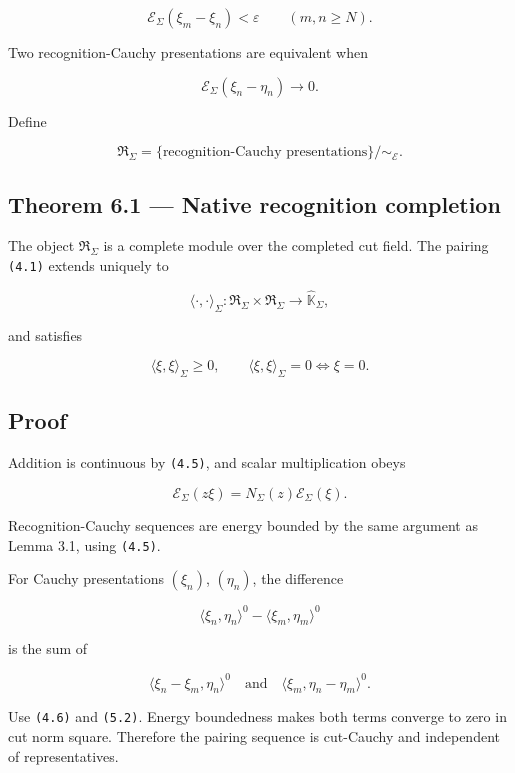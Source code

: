 \[
\mathcal E_\Sigma(\xi_m-\xi_n)<\varepsilon
\qquad(m,n\ge N).
\tag{6.1}
\]

Two recognition-Cauchy presentations are equivalent when

\[
\mathcal E_\Sigma(\xi_n-\eta_n)\longrightarrow0.
\tag{6.2}
\]

Define

\[
\boxed{
\mathfrak R_\Sigma
=
\{\text{recognition-Cauchy presentations}\}/\sim_{\mathcal E}.
}
\tag{6.3}
\]

\hypertarget{theorem-6.1-native-recognition-completion}{%
\subsection{Theorem 6.1 --- Native recognition completion}\label{theorem-6.1-native-recognition-completion}}

The object \(\mathfrak R_\Sigma\) is a complete module over the completed cut
field. The pairing \texttt{(4.1)} extends uniquely to

\[
\langle\cdot,\cdot\rangle_\Sigma:
\mathfrak R_\Sigma\times\mathfrak R_\Sigma
\longrightarrow
\widehat{\mathbb K}_\Sigma,
\tag{6.4}
\]

and satisfies

\[
\langle\xi,\xi\rangle_\Sigma\ge0,
\qquad
\langle\xi,\xi\rangle_\Sigma=0
\Longleftrightarrow
\xi=0.
\tag{6.5}
\]

\hypertarget{proof-6}{%
\subsection{Proof}\label{proof-6}}

Addition is continuous by \texttt{(4.5)}, and scalar multiplication obeys

\[
\mathcal E_\Sigma(z\xi)
=N_\Sigma(z)\mathcal E_\Sigma(\xi).
\tag{6.6}
\]

Recognition-Cauchy sequences are energy bounded by the same argument as Lemma
3.1, using \texttt{(4.5)}.

For Cauchy presentations \((\xi_n)\), \((\eta_n)\), the difference

\[
\langle\xi_n,\eta_n\rangle^0
-
\langle\xi_m,\eta_m\rangle^0
\]

is the sum of

\[
\langle\xi_n-\xi_m,\eta_n\rangle^0
\quad\text{and}\quad
\langle\xi_m,\eta_n-\eta_m\rangle^0.
\]

Use \texttt{(4.6)} and \texttt{(5.2)}. Energy boundedness makes both terms converge to zero
in cut norm square. Therefore the pairing sequence is cut-Cauchy and independent
of representatives.

